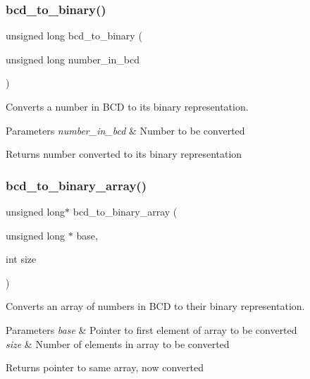 \subsubsection{\texorpdfstring{bcd\+\_\+to\+\_\+binary()}{bcd\_to\_binary()}}
{\footnotesize\ttfamily unsigned long bcd\+\_\+to\+\_\+binary (\begin{DoxyParamCaption}\item[{unsigned long}]{number\+\_\+in\+\_\+bcd }\end{DoxyParamCaption})}



Converts a number in B\+CD to its binary representation. 


\begin{DoxyParams}{Parameters}
{\em number\+\_\+in\+\_\+bcd} & Number to be converted \\
\hline
\end{DoxyParams}
\begin{DoxyReturn}{Returns}
number converted to its binary representation 
\end{DoxyReturn}
\hypertarget{group__utils_ga9eb356657a418586720db2f80c1ef2b6}{}\label{group__utils_ga9eb356657a418586720db2f80c1ef2b6} 
\subsubsection{\texorpdfstring{bcd\+\_\+to\+\_\+binary\+\_\+array()}{bcd\_to\_binary\_array()}}
{\footnotesize\ttfamily unsigned long$\ast$ bcd\+\_\+to\+\_\+binary\+\_\+array (\begin{DoxyParamCaption}\item[{unsigned long $\ast$}]{base,  }\item[{int}]{size }\end{DoxyParamCaption})}



Converts an array of numbers in B\+CD to their binary representation. 


\begin{DoxyParams}{Parameters}
{\em base} & Pointer to first element of array to be converted \\
\hline
{\em size} & Number of elements in array to be converted \\
\hline
\end{DoxyParams}
\begin{DoxyReturn}{Returns}
pointer to same array, now converted 
\end{DoxyReturn}
\hypertarget{group__utils_ga7f8f4adbdf567fe397208152fec35363}{}\label{group__utils_ga7f8f4adbdf567fe397208152fec35363} 
